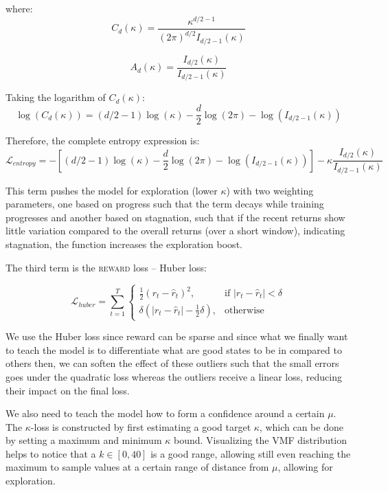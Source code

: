 where:
\begin{equation}
    C_d(\kappa) = \frac{\kappa^{d/2-1}}{(2\pi)^{d/2}I_{d/2-1}(\kappa)}
\end{equation}

\begin{equation}
    A_d(\kappa) = \frac{I_{d/2}(\kappa)}{I_{d/2-1}(\kappa)}
\end{equation}

Taking the logarithm of $C_d(\kappa)$:
\begin{equation}
    \log(C_d(\kappa)) = (d/2-1)\log(\kappa) - \frac{d}{2}\log(2\pi) - \log(I_{d/2-1}(\kappa))
\end{equation}

Therefore, the complete entropy expression is:
\begin{equation}
  \mathcal{L}_{entropy} = -\left[(d/2-1)\log(\kappa) - \frac{d}{2}\log(2\pi) - \log(I_{d/2-1}(\kappa))\right] - \kappa\frac{I_{d/2}(\kappa)}{I_{d/2-1}(\kappa)}
\end{equation}

This term pushes the model for exploration (lower $\kappa$) with two weighting parameters, one based on progress such that the term decays while training progresses and another based on stagnation, such that if the recent returns show little variation compared to the overall returns (over a short window), indicating stagnation, the function increases the exploration boost.

The third term is the \textsc{reward} loss -- Huber loss:

\begin{equation}
    \mathcal{L}_{huber} = \sum_{t=1}^{T} \begin{cases} 
    \frac{1}{2} \left( r_{t} - \hat{r}_{t} \right)^{2}, & \text{if } \left| r_{t} - \hat{r}_{t} \right| < \delta \\
    \delta \left( \left| r_{t} - \hat{r}_{t} \right| - \frac{1}{2} \delta \right), & \text{otherwise}
    \end{cases}
\end{equation}

We use the Huber loss since reward can be sparse and since what we finally want to teach the model is to differentiate what are good states to be in compared to others then, we can soften the effect of these outliers such that the small errors goes under the quadratic loss whereas the outliers receive a linear loss, reducing their impact on the final loss. 

We also need to teach the model how to form a confidence around a certain $\mu$. The $\kappa$-loss is constructed by first estimating a good target $\kappa$, which can be done by setting a maximum and minimum $\kappa$ bound. Visualizing the VMF distribution helps to notice that a $k \in [0,40]$ is a good range, allowing still even reaching the maximum to sample values at a certain range of distance from $\mu$, allowing for exploration.

